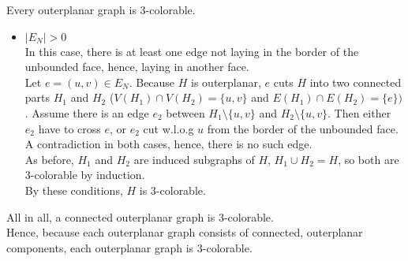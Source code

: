 \documentclass[a4paper]{article}
\begin{document}
\begin{solution}{24}
\begin{theorem}{Every outerplanar graph is 3-colorable.}
\begin{itemize}
\begin{itemize}
						\item {\emph{$|E_N| > 0$}}\\
							In this case, there is at least one edge not laying in the border of the unbounded face, hence, laying in another face.\\
							Let $e=(u,v) \in E_N$. Because $H$ is outerplanar, $e$ cuts $H$ into two connected parts $H_1$ and $H_2$ ($V(H_1) \cap V(H_2) = \{u,v\}$ and $E(H_1) \cap E(H_2) = \{e\})$. 
							Assume there is an edge $e_2$ between $H_1 \setminus \{u,v\}$ and $H_2 \setminus \{u,v\}$. Then either $e_2$ have to cross $e$, or $e_2$ cut w.l.o.g $u$ from the border of the unbounded face. A contradiction in both cases, hence, there is no such edge.\\
							As before, $H_1$ and $H_2$ are induced subgraphs of $H$, $H_1 \cup H_2 = H$, so both are 3-colorable by induction.\\
							By these conditions, $H$ is 3-colorable.
				\end{itemize}
		\end{itemize}				

		All in all, a connected outerplanar graph is 3-colorable.\\
		Hence, because each outerplanar graph consists of connected, outerplanar components, each outerplanar graph is 3-colorable.

		\end{theorem}
	\end{solution}
		
\end{document}
